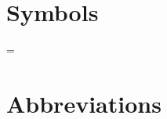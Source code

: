 \documentclass[11pt]{book}
\begin{document}
\setcounter{page}{1001}

\
\pagebreak

\blankpage





















\thispagestyle{empty}

\section{Symbols}

\begin{description}

\item[\similar]

\item[\compare]

\item[ = ]

\end{description}


\section{Abbreviations}
\end{document}
